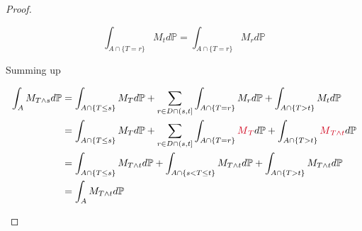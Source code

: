 \documentclass[10pt,a4paper]{article}
\theoremstyle{definition}
\begin{document}
\begin{proof}
\begin{enumerate}
		      \begin{equation*}
		      	\int _{A\cap \{T=r\}} M_{t} d\mathbb{P} =\int _{A\cap \{T=r\}} M_{r} d\mathbb{P}
		      \end{equation*}
		      
		      Summing up
		      
		      \begin{align*}
		      	\int _{A} M_{T\land s} d\mathbb{P} & =\int _{A\cap \{T\leq s\}} M_{T} d\mathbb{P} +\sum _{r\in D\cap ( s,t]}\int _{A\cap \{T=r\}} M_{r} d\mathbb{P} +\int _{A\cap \{T >t\}} M_{t} d\mathbb{P}                                                                                                                                          \\
		      	                                   & =\int _{A\cap \{T\leq s\}} M_{T} d\mathbb{P} +\sum _{r\in D\cap ( s,t]}\int _{A\cap \{T=r\}}\textcolor[rgb]{0.82,0.01,0.11}{M}\textcolor[rgb]{0.82,0.01,0.11}{_{T}} d\mathbb{P} +\int _{A\cap \{T >t\}}\textcolor[rgb]{0.82,0.01,0.11}{M}\textcolor[rgb]{0.82,0.01,0.11}{_{T\land t}} d\mathbb{P} \\
		      	                                   & =\int _{A\cap \{T\leq s\}} M_{T\land t} d\mathbb{P} +\int _{A\cap \{s< T\leq t\}} M_{T\land t} d\mathbb{P} +\int _{A\cap \{T >t\}} M_{T\land t} d\mathbb{P}                                                                                                                                       \\
		      	                                   & =\int _{A} M_{T\land t} d\mathbb{P}                                                                                                                                                                                                                                                               
		      \end{align*}
	\end{enumerate}
\end{proof}
\end{document}

